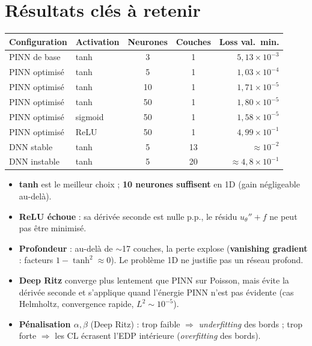 \documentclass[11pt]{article}
\newcommand{\key}[1]{\textbf{#1}}
\begin{document}
\section{Résultats clés à retenir}
\begin{center}\small
\begin{tabular}{llccr}
\toprule
Configuration & Activation & Neurones & Couches & Loss val.\ min.\\
\midrule
PINN de base   & tanh    & 3  & 1  & $5{,}13\times10^{-3}$\\
PINN optimisé  & tanh    & 5  & 1  & $1{,}03\times10^{-4}$\\
PINN optimisé  & tanh    & 10 & 1  & $1{,}71\times10^{-5}$\\
PINN optimisé  & tanh    & 50 & 1  & $1{,}80\times10^{-5}$\\
PINN optimisé  & sigmoid & 50 & 1  & $1{,}58\times10^{-5}$\\
PINN optimisé  & ReLU    & 50 & 1  & $4{,}99\times10^{-1}$\\
DNN stable     & tanh    & 5  & 13 & $\approx 10^{-2}$\\
DNN instable   & tanh    & 5  & 20 & $\approx 4{,}8\times10^{-1}$\\
\bottomrule
\end{tabular}
\end{center}
\begin{itemize}
  \item \key{tanh} est le meilleur choix ; \key{10 neurones suffisent} en 1D
        (gain négligeable au-delà).
  \item \key{ReLU échoue} : sa dérivée seconde est nulle p.p., le résidu
        $u_\theta''+f$ ne peut pas être minimisé.
  \item \key{Profondeur} : au-delà de $\sim$17 couches, la perte explose
        (\key{vanishing gradient} : facteurs $1-\tanh^2\!\approx 0$). Le problème
        1D ne justifie pas un réseau profond.
  \item \key{Deep Ritz} converge plus lentement que PINN sur Poisson, mais évite
        la dérivée seconde et s'applique quand l'énergie PINN n'est pas évidente
        (cas Helmholtz, convergence rapide, $L^2\!\sim\!10^{-5}$).
  \item \key{Pénalisation $\alpha,\beta$} (Deep Ritz) : trop faible $\Rightarrow$
        \emph{underfitting} des bords ; trop forte $\Rightarrow$ les CL écrasent
        l'EDP intérieure (\emph{overfitting} des bords).
\end{itemize}
\end{document}
